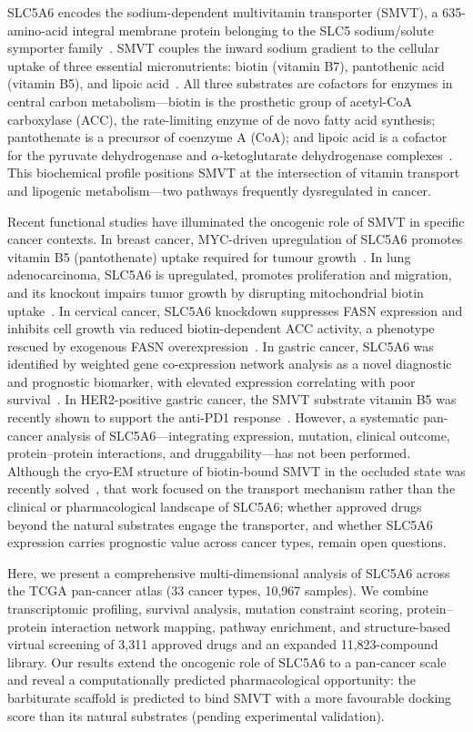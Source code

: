 \documentclass[10pt,letterpaper]{article}
\begin{document}
SLC5A6 encodes the sodium-dependent multivitamin transporter (SMVT), a 635-amino-acid integral membrane protein belonging to the SLC5 sodium/solute symporter family~\cite{prasad1998}. SMVT couples the inward sodium gradient to the cellular uptake of three essential micronutrients: biotin (vitamin B7), pantothenic acid (vitamin B5), and lipoic acid~\cite{wang1999}. All three substrates are cofactors for enzymes in central carbon metabolism---biotin is the prosthetic group of acetyl-CoA carboxylase (ACC), the rate-limiting enzyme of de novo fatty acid synthesis; pantothenate is a precursor of coenzyme A (CoA); and lipoic acid is a cofactor for the pyruvate dehydrogenase and $\alpha$-ketoglutarate dehydrogenase complexes~\cite{tong2005,leonardi2007}. This biochemical profile positions SMVT at the intersection of vitamin transport and lipogenic metabolism---two pathways frequently dysregulated in cancer.

Recent functional studies have illuminated the oncogenic role of SMVT in specific cancer contexts. In breast cancer, MYC-driven upregulation of SLC5A6 promotes vitamin B5 (pantothenate) uptake required for tumour growth~\cite{kreuzaler2023}. In lung adenocarcinoma, SLC5A6 is upregulated, promotes proliferation and migration, and its knockout impairs tumor growth by disrupting mitochondrial biotin uptake~\cite{zheng2025}. In cervical cancer, SLC5A6 knockdown suppresses FASN expression and inhibits cell growth via reduced biotin-dependent ACC activity, a phenotype rescued by exogenous FASN overexpression~\cite{wang2026}. In gastric cancer, SLC5A6 was identified by weighted gene co-expression network analysis as a novel diagnostic and prognostic biomarker, with elevated expression correlating with poor survival~\cite{sun2020}. In HER2-positive gastric cancer, the SMVT substrate vitamin B5 was recently shown to support the anti-PD1 response~\cite{wang2026b}. However, a systematic pan-cancer analysis of SLC5A6---integrating expression, mutation, clinical outcome, protein--protein interactions, and druggability---has not been performed. Although the cryo-EM structure of biotin-bound SMVT in the occluded state was recently solved~\cite{zhen2026}, that work focused on the transport mechanism rather than the clinical or pharmacological landscape of SLC5A6; whether approved drugs beyond the natural substrates engage the transporter, and whether SLC5A6 expression carries prognostic value across cancer types, remain open questions.

Here, we present a comprehensive multi-dimensional analysis of SLC5A6 across the TCGA pan-cancer atlas (33 cancer types, 10,967 samples). We combine transcriptomic profiling, survival analysis, mutation constraint scoring, protein--protein interaction network mapping, pathway enrichment, and structure-based virtual screening of 3,311 approved drugs and an expanded 11,823-compound library. Our results extend the oncogenic role of SLC5A6 to a pan-cancer scale and reveal a computationally predicted pharmacological opportunity: the barbiturate scaffold is predicted to bind SMVT with a more favourable docking score than its natural substrates (pending experimental validation).
\end{document}
